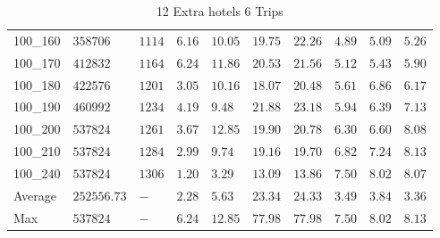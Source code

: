 \begin{center}
\begin{table}[]
\begin{tabular}{|lll|l|l|ll|lll|}
100\_160 & $358706   $ & $1114$ & $6.16$ & $10.05$  & $19.75$    & $22.26$   & $4.89$ & $5.09$   & $5.26$ \\
100\_170 & $412832   $ & $1164$ & $6.24$ & $11.86$  & $20.53$    & $21.56$   & $5.12$ & $5.43$   & $5.90$ \\
100\_180 & $422576   $ & $1201$ & $3.05$ & $10.16$  & $18.07$    & $20.48$   & $5.61$ & $6.86$   & $6.17$ \\
100\_190 & $460992   $ & $1234$ & $4.19$ & $9.48 $  & $21.88$    & $23.18$   & $5.94$ & $6.39$   & $7.13$ \\
100\_200 & $537824   $ & $1261$ & $3.67$ & $12.85$  & $19.90$    & $20.78$   & $6.30$ & $6.60$   & $8.08$ \\
100\_210 & $537824   $ & $1284$ & $2.99$ & $9.74 $  & $19.16$    & $19.70$   & $6.82$ & $7.24$   & $8.13$ \\
100\_240 & $537824   $ & $1306$ & $1.20$ & $3.29 $  & $13.09$    & $13.86$   & $7.50$ & $8.02$   & $8.07$ \\
\hline
Average  & $252556.73$ & $-   $ & $2.28$ & $5.63 $  & $23.34$    & $24.33$   & $3.49$ & $3.84$   & $3.36$ \\
Max      & $537824   $ & $-   $ & $6.24$ & $12.85$  & $77.98$    & $77.98$   & $7.50$ & $8.02$   & $8.13$ \\
\hline
\end{tabular}
\caption{12 Extra hotels 6 Trips}
\label{12-6}
\end{table}
\end{center}
